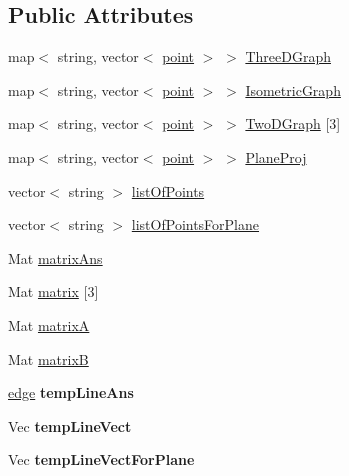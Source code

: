\subsection*{Public Attributes}
\begin{DoxyCompactItemize}
\item 
map$<$ string, vector$<$ \hyperlink{structpoint}{point} $>$ $>$ \hyperlink{classThreeDGraph__class_a10f2244053d72def3eed9fb4101f0236}{Three\+D\+Graph}
\item 
map$<$ string, vector$<$ \hyperlink{structpoint}{point} $>$ $>$ \hyperlink{classThreeDGraph__class_afa3f00ec2a3864317ad121d087c9896d}{Isometric\+Graph}
\item 
map$<$ string, vector$<$ \hyperlink{structpoint}{point} $>$ $>$ \hyperlink{classThreeDGraph__class_a352d2c3b25256d8a071132dd87606f99}{Two\+D\+Graph} \mbox{[}3\mbox{]}
\item 
map$<$ string, vector$<$ \hyperlink{structpoint}{point} $>$ $>$ \hyperlink{classThreeDGraph__class_ad800b572d58a46cbd5b4139b3ec7b173}{Plane\+Proj}
\item 
vector$<$ string $>$ \hyperlink{classThreeDGraph__class_ab24656328d4be1eae0f6f5742add5969}{list\+Of\+Points}
\item 
vector$<$ string $>$ \hyperlink{classThreeDGraph__class_a7a63687d665e48d41867a293d5d8bc16}{list\+Of\+Points\+For\+Plane}
\item 
Mat \hyperlink{classThreeDGraph__class_a52564aaa0f2223a754dccb28b347b009}{matrix\+Ans}
\item 
Mat \hyperlink{classThreeDGraph__class_a276acab9cffc9952e64514aad293da84}{matrix} \mbox{[}3\mbox{]}
\item 
Mat \hyperlink{classThreeDGraph__class_a03032b7bde495a752d3ccf43c3328f78}{matrixA}
\item 
Mat \hyperlink{classThreeDGraph__class_a487c0f52b65d943a04cf75077ab6b5fe}{matrixB}
\item 
\hyperlink{structedge}{edge} {\bfseries temp\+Line\+Ans}\hypertarget{classThreeDGraph__class_aa7a987df28f93f04fa0021d56a364a98}{}\label{classThreeDGraph__class_aa7a987df28f93f04fa0021d56a364a98}

\item 
Vec {\bfseries temp\+Line\+Vect}\hypertarget{classThreeDGraph__class_a48d310a18f7602769320d2dae4445d25}{}\label{classThreeDGraph__class_a48d310a18f7602769320d2dae4445d25}

\item 
Vec {\bfseries temp\+Line\+Vect\+For\+Plane}\hypertarget{classThreeDGraph__class_a68fb902385d303dcfcd1d9b0afd935cb}{}\label{classThreeDGraph__class_a68fb902385d303dcfcd1d9b0afd935cb}

\end{DoxyCompactItemize}


